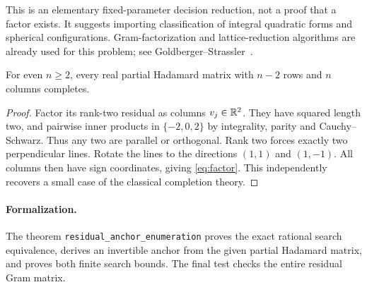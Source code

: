 This is an elementary fixed-parameter decision reduction, not a proof
that a factor exists. It suggests importing classification of integral
quadratic forms and spherical configurations. Gram-factorization and
lattice-reduction algorithms are already used for this problem;
see Goldberger--Strassler~\cite{LLL}.

\begin{proposition}
For even $n\ge2$, every real partial Hadamard matrix with $n-2$ rows
and $n$ columns completes.
\end{proposition}
\begin{proof}
Factor its rank-two residual as columns $v_j\in\mathbb R^2$. They have squared
length two, and pairwise inner products in $\{-2,0,2\}$ by integrality,
parity and Cauchy--Schwarz. Thus any two are parallel or orthogonal.
Rank two forces exactly two perpendicular lines. Rotate the lines to
the directions $(1,1)$ and $(1,-1)$. All columns then have sign
coordinates, giving \eqref{eq:factor}. This independently recovers a
small case of the classical completion theory.
\end{proof}

\paragraph{Formalization.} The theorem \texttt{residual\_\allowbreak anchor\_\allowbreak enumeration} proves the exact rational search equivalence, derives an invertible anchor from the given partial Hadamard matrix, and proves both finite search bounds. The final test checks the entire residual Gram matrix.
